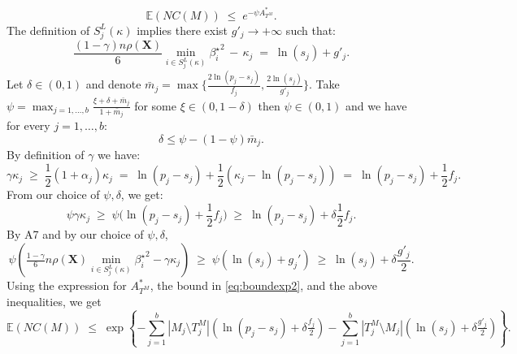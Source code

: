 \documentclass[aos]{imsart}
\theoremstyle{plain}
\newcommand{\E}{\mathbb{E}}
\newcommand{\bs}{\boldsymbol}
\begin{document}
\begin{equation}\label{eq:boundexp2}
    \E(NC(M))\;\leq\;e^{-\psi A_{T^M}^*}.
\end{equation}
The definition of $S^{L}_j(\kappa)$ implies there exist $g'_j \to +\infty$ such that:
$$\frac{(1-\gamma) n\rho(\bs X)}{6}\min_{i\in S^{L}_j(\kappa)}{\beta^{\star}_i}^{2}\,- \,\kappa_j \;=\; \ln(s_j) + g'_{j}.$$
Let $\delta \in (0,1)$ and denote $\bar{m}_j=\max\big\{\frac{2\ln(p_j-s_j)}{f_j},\frac{2\ln(s_j)}{g'_{j}}\big\}$. Take $\psi=\max_{j=1,\ldots,b}\frac{\xi + \delta + \bar{m}_j}{1+\bar{m}_j}$ for some $\xi \in(0, 1- \delta)$ then $\psi \in (0,1)$ and we have for every $j=1,\ldots,b$:
$$\delta \leq \psi-(1-\psi)\bar{m}_j.$$ 
By definition of $\gamma$ we have: 
$$
\gamma\kappa_j\;\geq\;\frac12 (1+\alpha_j)\kappa_j\;=\;\ln(p_j-s_j)+\frac12(\kappa_j-\ln(p_j-s_j)) \;=\; \ln(p_j-s_j)+ \frac12f_j.
$$
From our choice of $\psi,\delta$, we get:
$$\psi\gamma\kappa_j \;\geq\; \psi\big(\ln(p_j-s_j)+ \frac12f_j\big) \;\geq\;  \ln(p_j-s_j)+ \delta\frac12f_j.$$
By A7 and by our choice of $\psi,\delta$,
$$\psi\left(\tfrac{1-\gamma}{6} n \rho(\bs X) \min_{i\in S^{L}_j(\kappa)}{\beta^{\star}_i}^{2} - \gamma\kappa_j\right) \;\geq\; \psi\left(\ln(s_j)+g_j'\right) \;\geq\; \ln(s_j)+\delta \frac{g'_j}{2}.
$$
Using the expression for $A_{T^M}^*$, the bound in \eqref{eq:boundexp2}, and the above inequalities, we get
$$
\E(NC(M))\;\leq\;\exp\left\{- \sum_{j=1}^b |M_j\setminus T^M_j|(\ln(p_j-s_j)+\delta \tfrac{f_j}{2})-\sum_{j=1}^b |T^M_j\setminus M_j|(\ln(s_j)+\delta \tfrac{g'_j}{2})\right\}.
$$
\end{document}
